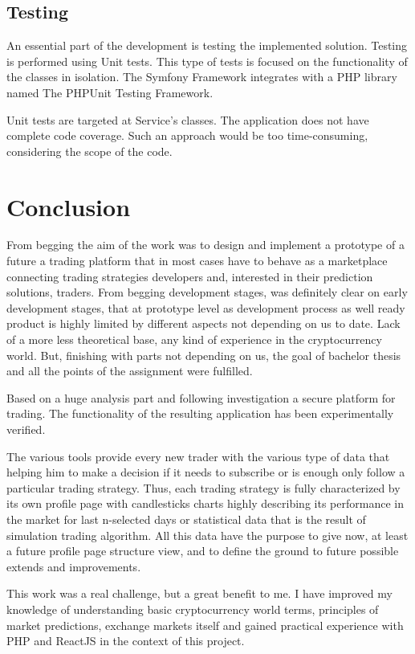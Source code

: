 \documentclass[thesis=B,english]{FITthesis}[2019/03/06]
\begin{document}
\section{Testing} 
An essential part of the development is testing the implemented solution. Testing is performed using Unit tests.
This type of tests is focused on the functionality of the classes in isolation. The Symfony Framework integrates with a PHP library named The PHPUnit Testing Framework.

Unit tests are targeted at Service's classes. The application does not have complete code coverage. Such an approach would be too time-consuming, considering the scope of the code.
 

\chapter{Conclusion}
From begging the aim of the work was to design and implement a prototype of a future a trading platform that in most cases have to behave as a marketplace connecting trading strategies developers and, interested in their prediction solutions, traders. From begging development stages, was definitely clear on early development stages, that at prototype level as development process as well ready product is highly limited by different aspects not depending on us to date. Lack of a more less theoretical base, any kind of experience in the cryptocurrency world.
But, finishing with parts not depending on us, the goal of bachelor thesis and all the points of the assignment were fulfilled.

Based on a huge analysis part and following investigation a secure platform for trading. The functionality of the resulting application has been experimentally verified.

The various tools provide every new trader with the various type of data that helping him to make a decision if it needs to subscribe or is enough only follow a particular trading strategy. Thus, each trading strategy is fully characterized by its own profile page with candlesticks charts highly describing its performance in the market for last n-selected days or statistical data that is the result of simulation trading algorithm. All this data have the purpose to give now, at least a  future profile page structure view, and to define the ground to future possible extends and improvements.

This work was a real challenge, but a great benefit to me. I have improved my knowledge of understanding basic cryptocurrency world terms, principles of market predictions, exchange markets itself and gained practical experience with PHP and ReactJS in the context of this project. 
\end{document}
